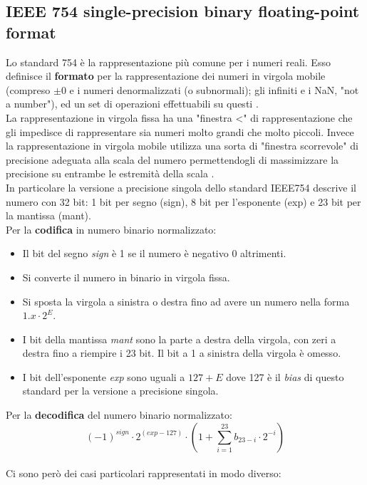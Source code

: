 \documentclass[]{IEEEtran}
\begin{document}
\subsection{IEEE 754 single-precision binary floating-point format}
Lo standard 754\cite{IEEE754} è la rappresentazione più comune per i numeri reali. Esso definisce il \textbf{formato} per la rappresentazione dei numeri in virgola mobile (compreso $\pm 0$ e i numeri denormalizzati (o subnormali); gli infiniti e i NaN, "not a number"), ed un set di operazioni effettuabili su questi \cite{IEEE754Wiki}.
\\La rappresentazione in virgola fissa ha una "finestra <" di rappresentazione che gli impedisce di rappresentare sia numeri molto grandi che molto piccoli. Invece la rappresentazione in virgola mobile utilizza una sorta di "finestra scorrevole" di precisione adeguata alla scala del numero permettendogli di massimizzare la precisione su entrambe le estremità della scala \cite{IEEE754Online}.
\\In particolare la versione a precisione singola dello standard IEEE754 descrive il numero con 32 bit: 1 bit per segno (sign), 8 bit per l'esponente (exp) e 23 bit per la mantissa (mant).
\\Per la \textbf{codifica} in numero binario normalizzato:
\begin{itemize}
    \item Il bit del segno \textit{sign} è 1 se il numero è negativo 0 altrimenti.
    \item Si converte il numero in binario in virgola fissa.
    \item Si sposta la virgola a sinistra o destra fino ad avere un numero nella forma $1.x \cdot 2^{E}$.
    \item I bit della mantissa \textit{mant} sono la parte a destra della virgola, con zeri a destra fino a riempire i 23 bit. Il bit a 1 a sinistra della virgola è omesso.
    \item I bit dell'esponente \textit{exp} sono uguali a $127+E$ dove 127 è il \textit{bias} di questo standard per la versione a precisione singola.
\end{itemize}
Per la \textbf{decodifica} del numero binario normalizzato: $$(-1)^{sign}\cdot 2^{(exp-127)} \cdot (1 + \sum_{i=1}^{23}b_{23-i}\cdot 2^{-i})$$
\\Ci sono però dei casi particolari rappresentati in modo diverso:
\end{document}
